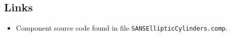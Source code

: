 \subsection*{Links}
\begin{itemize}
  \item Component source code found in file \texttt{SANSEllipticCylinders.comp}.
\end{itemize}

